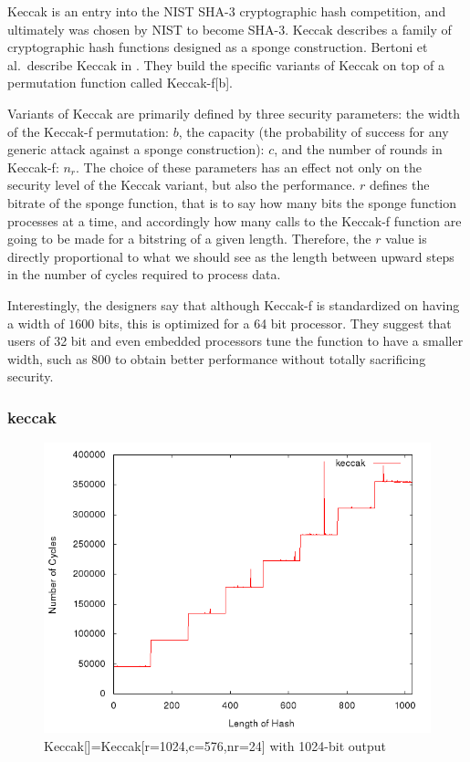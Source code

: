 Keccak is an entry into the NIST SHA-3 cryptographic hash competition, and
ultimately was chosen by NIST to become SHA-3. Keccak describes a family of
cryptographic hash functions designed as a sponge construction. Bertoni et al.\
describe Keccak in \cite{bertoni2009keccak}. They build the specific variants of
Keccak on top of a permutation function called Keccak-f[b].

Variants of Keccak are primarily defined by three security parameters: the width
of the Keccak-f permutation: $b$, the capacity (the probability of success for
any generic attack against a sponge construction): $c$, and the number of rounds in
Keccak-f: $n_r$\cite{bertoni2009keccak}. The choice of these parameters has an
effect not only on the security level of the Keccak variant, but also the
performance. $r$ defines the bitrate of the sponge function, that is to say how
many bits the sponge function processes at a time, and accordingly how many
calls to the Keccak-f function are going to be made for a bitstring of a given
length. Therefore, the $r$ value is directly proportional to what we should see
as the length between upward steps in the number of cycles required to process
data.

Interestingly, the designers say that although Keccak-f is standardized on
having a width of $1600$ bits, this is optimized for a 64 bit processor. They
suggest that users of 32 bit and even embedded processors tune the function to
have a smaller width, such as $800$ to obtain better performance without totally
sacrificing security\cite{bertoni2009keccak}.

\subsubsection{keccak}
\begin{figure}[H]
    \begin{center}
        \includegraphics[scale=0.5]{images/keccak.png} 
        \caption{Keccak[]=Keccak[r=1024,c=576,nr=24] with 1024-bit output}
    \end{center}
\end{figure}

